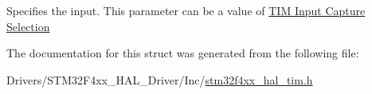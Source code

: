 Specifies the input. This parameter can be a value of \hyperlink{group___t_i_m___input___capture___selection}{T\+IM Input Capture Selection} 

The documentation for this struct was generated from the following file\+:\begin{DoxyCompactItemize}
\item 
Drivers/\+S\+T\+M32\+F4xx\+\_\+\+H\+A\+L\+\_\+\+Driver/\+Inc/\hyperlink{stm32f4xx__hal__tim_8h}{stm32f4xx\+\_\+hal\+\_\+tim.\+h}\end{DoxyCompactItemize}
